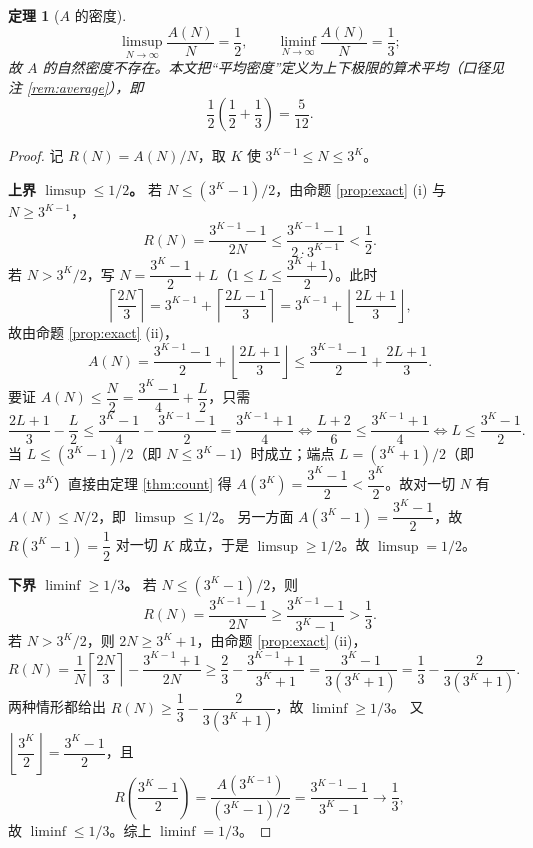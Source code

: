 \documentclass[11pt]{article}
\newtheorem{theorem}{定理}[section]
\theoremstyle{definition}
\theoremstyle{definition}
\theoremstyle{remark}
\begin{document}
\begin{theorem}[\(A\) 的密度]\label{thm:density}
\[
\limsup_{N\to\infty}\frac{A(N)}{N}=\frac12,\qquad
\liminf_{N\to\infty}\frac{A(N)}{N}=\frac13;
\]
故 \(A\) 的自然密度不存在。本文把“平均密度”定义为上下极限的算术平均（口径见注 \ref{rem:average}），即
\[
\frac12\left(\frac12+\frac13\right)=\frac{5}{12}.
\]
\end{theorem}

\begin{proof}
记 \(R(N)=A(N)/N\)，取 \(K\) 使 \(3^{K-1}\le N\le3^K\)。

\textbf{上界 \(\limsup\le1/2\)。}
若 \(N\le(3^K-1)/2\)，由命题 \ref{prop:exact} (i) 与 \(N\ge3^{K-1}\)，
\[
R(N)=\frac{3^{K-1}-1}{2N}\le\frac{3^{K-1}-1}{2\cdot3^{K-1}}<\frac12 .
\]
若 \(N>3^K/2\)，写 \(N=\dfrac{3^K-1}{2}+L\)（\(1\le L\le\dfrac{3^K+1}{2}\)）。此时
\[
\left\lceil\frac{2N}{3}\right\rceil
=3^{K-1}+\left\lceil\frac{2L-1}{3}\right\rceil
=3^{K-1}+\left\lfloor\frac{2L+1}{3}\right\rfloor,
\]
故由命题 \ref{prop:exact} (ii)，
\[
A(N)=\frac{3^{K-1}-1}{2}+\left\lfloor\frac{2L+1}{3}\right\rfloor
\le\frac{3^{K-1}-1}{2}+\frac{2L+1}{3}.
\]
要证 \(A(N)\le\dfrac N2=\dfrac{3^K-1}{4}+\dfrac L2\)，只需
\[
\frac{2L+1}{3}-\frac L2\le\frac{3^K-1}{4}-\frac{3^{K-1}-1}{2}=\frac{3^{K-1}+1}{4}
\iff \frac{L+2}{6}\le\frac{3^{K-1}+1}{4}
\iff L\le\frac{3^K-1}{2}.
\]
当 \(L\le(3^K-1)/2\)（即 \(N\le3^K-1\)）时成立；端点 \(L=(3^K+1)/2\)（即 \(N=3^K\)）直接由定理 \ref{thm:count} 得 \(A(3^K)=\dfrac{3^K-1}{2}<\dfrac{3^K}{2}\)。故对一切 \(N\) 有 \(A(N)\le N/2\)，即 \(\limsup\le1/2\)。
另一方面 \(A(3^K-1)=\dfrac{3^K-1}{2}\)，故 \(R(3^K-1)=\dfrac12\) 对一切 \(K\) 成立，于是 \(\limsup\ge1/2\)。故 \(\limsup=1/2\)。

\textbf{下界 \(\liminf\ge1/3\)。}
若 \(N\le(3^K-1)/2\)，则
\[
R(N)=\frac{3^{K-1}-1}{2N}\ge\frac{3^{K-1}-1}{3^K-1}>\frac13 .
\]
若 \(N>3^K/2\)，则 \(2N\ge3^K+1\)，由命题 \ref{prop:exact} (ii)，
\[
R(N)=\frac{1}{N}\left\lceil\frac{2N}{3}\right\rceil-\frac{3^{K-1}+1}{2N}
\ge\frac23-\frac{3^{K-1}+1}{3^K+1}
=\frac{3^K-1}{3(3^K+1)}
=\frac13-\frac{2}{3(3^K+1)} .
\]
两种情形都给出 \(R(N)\ge\dfrac13-\dfrac{2}{3(3^K+1)}\)，故 \(\liminf\ge1/3\)。
又 \(\left\lfloor\dfrac{3^K}{2}\right\rfloor=\dfrac{3^K-1}{2}\)，且
\[
R\!\left(\frac{3^K-1}{2}\right)=\frac{A(3^{K-1})}{(3^K-1)/2}=\frac{3^{K-1}-1}{3^K-1}\longrightarrow\frac13,
\]
故 \(\liminf\le1/3\)。综上 \(\liminf=1/3\)。
\end{proof}
\end{document}
